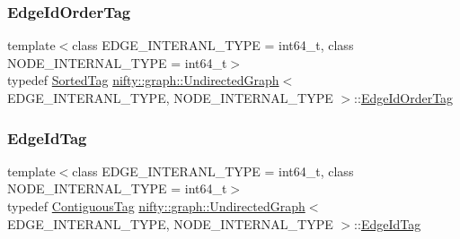 \subsubsection{\texorpdfstring{Edge\+Id\+Order\+Tag}{EdgeIdOrderTag}}
{\footnotesize\ttfamily template$<$class E\+D\+G\+E\+\_\+\+I\+N\+T\+E\+R\+A\+N\+L\+\_\+\+T\+Y\+PE = int64\+\_\+t, class N\+O\+D\+E\+\_\+\+I\+N\+T\+E\+R\+N\+A\+L\+\_\+\+T\+Y\+PE = int64\+\_\+t$>$ \\
typedef \hyperlink{structnifty_1_1graph_1_1SortedTag}{Sorted\+Tag} \hyperlink{classnifty_1_1graph_1_1UndirectedGraph}{nifty\+::graph\+::\+Undirected\+Graph}$<$ E\+D\+G\+E\+\_\+\+I\+N\+T\+E\+R\+A\+N\+L\+\_\+\+T\+Y\+PE, N\+O\+D\+E\+\_\+\+I\+N\+T\+E\+R\+N\+A\+L\+\_\+\+T\+Y\+PE $>$\+::\hyperlink{classnifty_1_1graph_1_1UndirectedGraph_a2f74e8de961bf80dc037ceedf58c46a4}{Edge\+Id\+Order\+Tag}}

\mbox{\label{classnifty_1_1graph_1_1UndirectedGraph_a5e5a59e9d25ab322da5e8286cadc3e00}} 
\subsubsection{\texorpdfstring{Edge\+Id\+Tag}{EdgeIdTag}}
{\footnotesize\ttfamily template$<$class E\+D\+G\+E\+\_\+\+I\+N\+T\+E\+R\+A\+N\+L\+\_\+\+T\+Y\+PE = int64\+\_\+t, class N\+O\+D\+E\+\_\+\+I\+N\+T\+E\+R\+N\+A\+L\+\_\+\+T\+Y\+PE = int64\+\_\+t$>$ \\
typedef \hyperlink{structnifty_1_1graph_1_1ContiguousTag}{Contiguous\+Tag} \hyperlink{classnifty_1_1graph_1_1UndirectedGraph}{nifty\+::graph\+::\+Undirected\+Graph}$<$ E\+D\+G\+E\+\_\+\+I\+N\+T\+E\+R\+A\+N\+L\+\_\+\+T\+Y\+PE, N\+O\+D\+E\+\_\+\+I\+N\+T\+E\+R\+N\+A\+L\+\_\+\+T\+Y\+PE $>$\+::\hyperlink{classnifty_1_1graph_1_1UndirectedGraph_a5e5a59e9d25ab322da5e8286cadc3e00}{Edge\+Id\+Tag}}

\mbox{\label{classnifty_1_1graph_1_1UndirectedGraph_a70e38582c25deca5e0ce080277cb30fc}} 
